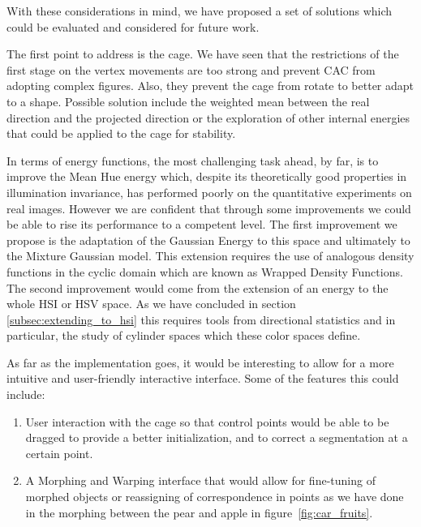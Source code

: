 With these considerations in mind, we have proposed a set of solutions which could be evaluated and considered for future work.

The first point to address is the cage. We have seen that the restrictions of the first stage on the vertex movements are too strong and prevent CAC from adopting complex figures. Also, they prevent the cage from rotate to better adapt to a shape. Possible solution include the weighted mean between the real direction and the projected direction or  the exploration of other internal energies that could be applied to the cage for stability.

In terms of energy functions, the most challenging task ahead, by far, is to improve the Mean Hue energy which, despite its theoretically good properties in illumination invariance, has performed poorly on the quantitative experiments on real images. However we are confident that through some improvements we could be able to rise its performance to a competent level. The first improvement we propose is the adaptation of the Gaussian Energy to this space and ultimately to the Mixture Gaussian model. This extension requires the use of analogous density functions in the cyclic domain which are known as Wrapped Density Functions. The second improvement would come from the extension of an energy to the whole HSI or HSV space. As we have concluded in section \ref{subsec:extending_to_hsi} this requires tools from directional statistics and in particular, the study of cylinder spaces which these color spaces define.

As far as the implementation goes, it would be interesting to allow for a more intuitive and user-friendly interactive interface. Some of the features this could include:
\begin{enumerate}
	\item User interaction with the cage so that control points would be able to be dragged to provide a better initialization, and to correct a segmentation at a certain point.
	\item A Morphing and Warping interface that would allow for fine-tuning of morphed objects or reassigning of correspondence in points as we have done in the morphing between the pear and apple in figure~\ref{fig:car_fruits}.
\end{enumerate} 

